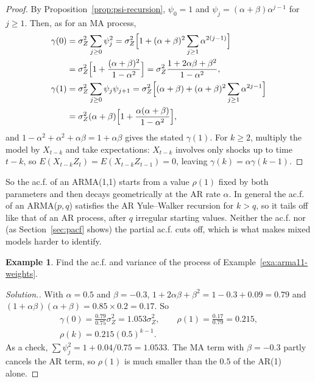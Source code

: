 \documentclass[11pt,a4paper]{article}
\theoremstyle{definition}
\newtheorem{exa}[thm]{Example}
\newenvironment{solution}
  {\renewcommand{\qedsymbol}{}\begin{proof}[\textit{Solution}.]}
  {\end{proof}}
\begin{document}
\begin{proof}
By Proposition~\ref{prop:psi-recursion}, $\psi_0 = 1$ and $\psi_j = (\alpha + \beta)\alpha^{j-1}$ for $j \ge 1$. Then, as for an MA process,
\begin{align*}
\gamma(0) &= \sigma_Z^2\sum_{j\ge0}\psi_j^2 = \sigma_Z^2\Bigl[1 + (\alpha + \beta)^2\sum_{j\ge1}\alpha^{2(j-1)}\Bigr] \\
&= \sigma_Z^2\Bigl[1 + \frac{(\alpha + \beta)^2}{1 - \alpha^2}\Bigr] = \sigma_Z^2\frac{1 + 2\alpha\beta + \beta^2}{1 - \alpha^2} , \\
\gamma(1) &= \sigma_Z^2\sum_{j\ge0}\psi_j\psi_{j+1} = \sigma_Z^2\Bigl[(\alpha + \beta) + (\alpha + \beta)^2\sum_{j\ge1}\alpha^{2j-1}\Bigr] \\
&= \sigma_Z^2(\alpha + \beta)\Bigl[1 + \frac{\alpha(\alpha + \beta)}{1 - \alpha^2}\Bigr] ,
\end{align*}
and $1 - \alpha^2 + \alpha^2 + \alpha\beta = 1 + \alpha\beta$ gives the stated $\gamma(1)$. For $k \ge 2$, multiply the model by $X_{t-k}$ and take expectations: $X_{t-k}$ involves only
shocks up to time $t - k$, so $E(X_{t-k}Z_t) = E(X_{t-k}Z_{t-1}) = 0$, leaving $\gamma(k) = \alpha\gamma(k - 1)$.
\end{proof}

So the ac.f. of an ARMA(1,1) starts from a value $\rho(1)$ fixed by both parameters and then decays geometrically
at the AR rate $\alpha$. In general the ac.f. of an ARMA($p, q$) satisfies the AR Yule--Walker recursion for $k > q$, so it tails
off like that of an AR process, after $q$ irregular starting values. Neither the ac.f. nor (as Section~\ref{sec:pacf}
shows) the partial ac.f. cuts off, which is what makes mixed models harder to identify.

\begin{exa}\label{exa:arma11-acf}
Find the ac.f. and variance of the process of Example~\ref{exa:arma11-weights}.
\end{exa}

\begin{solution}
With $\alpha = 0.5$ and $\beta = -0.3$, $1 + 2\alpha\beta + \beta^2 = 1 - 0.3 + 0.09 = 0.79$ and $(1 + \alpha\beta)(\alpha + \beta) = 0.85 \times 0.2 = 0.17$. So
\begin{gather*}
\gamma(0) = \frac{0.79}{0.75}\sigma_Z^2 = 1.053\sigma_Z^2 , \qquad \rho(1) = \frac{0.17}{0.79} = 0.215 , \\
\rho(k) = 0.215(0.5)^{k-1} .
\end{gather*}
As a check, $\sum\psi_j^2 = 1 + 0.04/0.75 = 1.0533$. The MA term with $\beta = -0.3$ partly cancels the AR term, so $\rho(1)$ is much smaller than
the $0.5$ of the AR(1) alone.
\end{solution}
\end{document}
